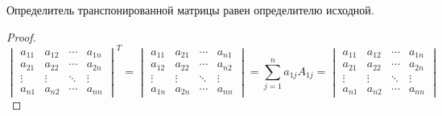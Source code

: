 \begin{statement}
Определитель транспонированной матрицы равен определителю исходной.
\end{statement}
\begin{proof}
\begin{equation*}
\begin{vmatrix}
a_{11} & a_{12} & \cdots & a_{1n} \\
a_{21} & a_{22} & \cdots & a_{2n} \\
\vdots & \vdots & \ddots & \vdots \\
a_{n1} & a_{n2} & \cdots & a_{nn}
\end{vmatrix}^T =
\begin{vmatrix}
a_{11} & a_{21} & \cdots & a_{n1} \\
a_{12} & a_{22} & \cdots & a_{n2} \\
\vdots & \vdots & \ddots & \vdots \\
a_{1n} & a_{2n} & \cdots & a_{nn}
\end{vmatrix} =
\sum_{j=1}^n a_{1j} A_{1j} =
\begin{vmatrix}
a_{11} & a_{12} & \cdots & a_{1n} \\
a_{21} & a_{22} & \cdots & a_{2n} \\
\vdots & \vdots & \ddots & \vdots \\
a_{n1} & a_{n2} & \cdots & a_{nn}
\end{vmatrix}
\end{equation*}
\end{proof}


